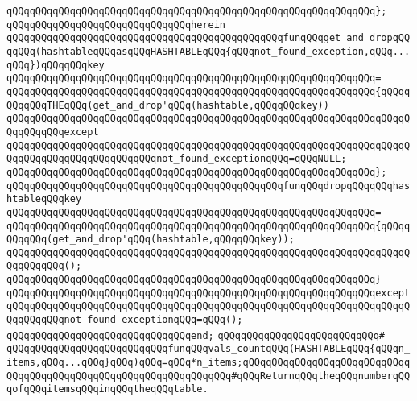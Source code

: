 \verb|qQQqqQQqqQQqqQQqqQQqqQQqqQQqqQQqqQQqqQQqqQQqqQQqqQQqqQQqqQQqqQQq};|\newline
\verb|qQQqqQQqqQQqqQQqqQQqqQQqqQQqqQQqherein|\newline
\verb|qQQqqQQqqQQqqQQqqQQqqQQqqQQqqQQqqQQqqQQqqQQqqQQqfunqQQqget_and_dropqQQqqQQq(hashtableqQQqasqQQqHASHTABLEqQQq{qQQqnot_found_exception,qQQq...qQQq})qQQqqQQqkey|\newline
\verb|qQQqqQQqqQQqqQQqqQQqqQQqqQQqqQQqqQQqqQQqqQQqqQQqqQQqqQQqqQQqqQQq=|\newline
\verb|qQQqqQQqqQQqqQQqqQQqqQQqqQQqqQQqqQQqqQQqqQQqqQQqqQQqqQQqqQQqqQQq{qQQqqQQqqQQqTHEqQQq(get_and_drop'qQQq(hashtable,qQQqqQQqkey))|\newline
\verb|qQQqqQQqqQQqqQQqqQQqqQQqqQQqqQQqqQQqqQQqqQQqqQQqqQQqqQQqqQQqqQQqqQQqqQQqqQQqqQQqexcept|\newline
\verb|qQQqqQQqqQQqqQQqqQQqqQQqqQQqqQQqqQQqqQQqqQQqqQQqqQQqqQQqqQQqqQQqqQQqqQQqqQQqqQQqqQQqqQQqqQQqqQQqnot_found_exceptionqQQq=qQQqNULL;|\newline
\verb|qQQqqQQqqQQqqQQqqQQqqQQqqQQqqQQqqQQqqQQqqQQqqQQqqQQqqQQqqQQqqQQq};|\newline
\newline
\verb|qQQqqQQqqQQqqQQqqQQqqQQqqQQqqQQqqQQqqQQqqQQqqQQqfunqQQqdropqQQqqQQqhashtableqQQqkey|\newline
\verb|qQQqqQQqqQQqqQQqqQQqqQQqqQQqqQQqqQQqqQQqqQQqqQQqqQQqqQQqqQQqqQQq=|\newline
\verb|qQQqqQQqqQQqqQQqqQQqqQQqqQQqqQQqqQQqqQQqqQQqqQQqqQQqqQQqqQQqqQQq{qQQqqQQqqQQq(get_and_drop'qQQq(hashtable,qQQqqQQqkey));|\newline
\verb|qQQqqQQqqQQqqQQqqQQqqQQqqQQqqQQqqQQqqQQqqQQqqQQqqQQqqQQqqQQqqQQqqQQqqQQqqQQqqQQq();|\newline
\verb|qQQqqQQqqQQqqQQqqQQqqQQqqQQqqQQqqQQqqQQqqQQqqQQqqQQqqQQqqQQqqQQq}|\newline
\verb|qQQqqQQqqQQqqQQqqQQqqQQqqQQqqQQqqQQqqQQqqQQqqQQqqQQqqQQqqQQqqQQqexcept|\newline
\verb|qQQqqQQqqQQqqQQqqQQqqQQqqQQqqQQqqQQqqQQqqQQqqQQqqQQqqQQqqQQqqQQqqQQqqQQqqQQqqQQqnot_found_exceptionqQQq=qQQq();|\newline
\verb|qQQqqQQqqQQqqQQqqQQqqQQqqQQqqQQqend;|\newline
\newline
\verb|qQQqqQQqqQQqqQQqqQQqqQQqqQQq#|\newline
\verb|qQQqqQQqqQQqqQQqqQQqqQQqqQQqfunqQQqvals_countqQQq(HASHTABLEqQQq{qQQqn_items,qQQq...qQQq}qQQq)qQQq=qQQq*n_items;qQQqqQQqqQQqqQQqqQQqqQQqqQQqqQQqqQQqqQQqqQQqqQQqqQQqqQQqqQQqqQQqqQQq#qQQqReturnqQQqtheqQQqnumberqQQqofqQQqitemsqQQqinqQQqtheqQQqtable.|\newline
